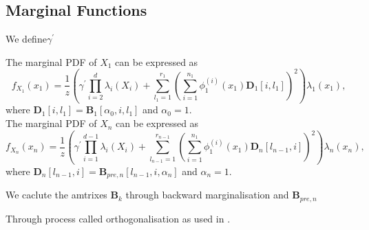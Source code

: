\subsection{Marginal Functions}

We define$ \gamma^{\prime}$

The marginal PDF of $X_1$ can be expressed as
\begin{equation}
	f_{X_1}(x_1) = \frac{1}{z} \left(\gamma^{\prime} \prod_{i=2}^{d} \lambda_i(X_i) + \sum_{l_1=1}^{r_1} \left(\sum_{i=1}^{n_1} \phi^{(i)}_1(x_1) \bm{D}_1[i, l_1] \right)^2 \right) \lambda_1(x_1),
\end{equation}
where $\bm{D}_1[i, l_1] = \bm{B}_1[\alpha_0, i, l_1]$ and $\alpha_0 = 1$.\\
The marginal PDF of $X_n$ can be expressed as
\begin{equation}
	f_{X_n}(x_n) = \frac{1}{z} \left(\gamma^{\prime} \prod_{i=1}^{d-1} \lambda_i(X_i) + \sum_{l_{n-1}=1}^{r_{n-1}} \left(\sum_{i=1}^{n_1} \phi^{(i)}_1(x_1) \bm{D}_n[l_{n-1},i] \right)^2 \right) \lambda_n(x_n),
\end{equation}
where $\bm{D}_n[l_{n-1},i] = \bm{B}_{pre,n}[l_{n-1}, i, \alpha_n]$ and $\alpha_n = 1$.



We caclute the amtrixes $\bm{B}_k$ through backward marginalisation and  $\bm{B}_{pre,n}$

Through process called orthogonalisation \cite{} as used in \cite{}.




